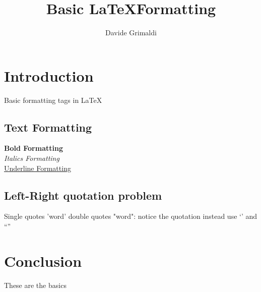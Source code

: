 \documentclass{article}
\title{Basic \LaTeX Formatting}
\author{Davide Grimaldi}
\date{}
\begin{document}
    \maketitle
    \section{Introduction}
        Basic formatting tags in \LaTeX

        \subsection{Text Formatting}
            \textbf{Bold Formatting} \\ %
            \emph{Italics Formatting}\\
            \underline{Underline Formatting}

        \subsection{Left-Right quotation problem}
            Single quotes 'word' double quotes "word": notice the quotation
            instead use `' and ``''

    \section{Conclusion}
    These are the basics
        
\end{document}
